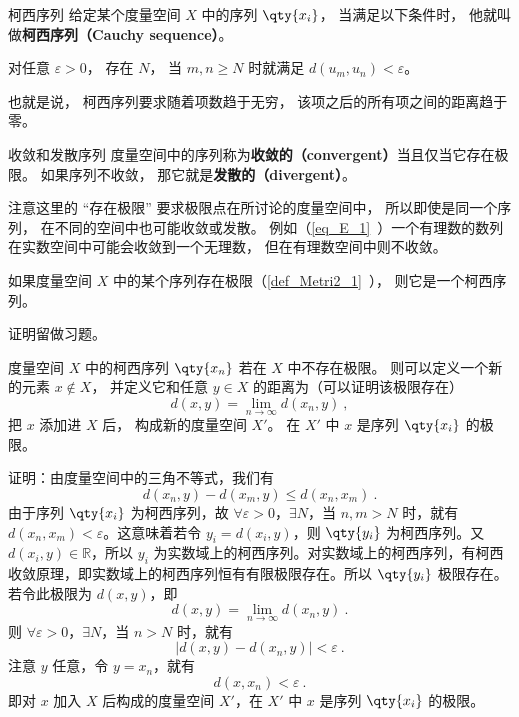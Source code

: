 

\begin{definition}{柯西序列}
给定某个度量空间 $X$ 中的序列 $\qty{x_i}$， 当满足以下条件时， 他就叫做\textbf{柯西序列（Cauchy sequence）}。

对任意 $\varepsilon > 0$， 存在 $N$， 当 $m, n \geqslant N$ 时就满足 $d(u_m, u_n) < \varepsilon$。
\end{definition}
也就是说， 柯西序列要求随着项数趋于无穷， 该项之后的所有项之间的距离趋于零。

\begin{definition}{收敛和发散序列}\label{def_cauchy_1}
度量空间中的序列称为\textbf{收敛的（convergent）}当且仅当它存在极限。 如果序列不收敛， 那它就是\textbf{发散的（divergent）}。
\end{definition}
注意这里的 “存在极限” 要求极限点在所讨论的度量空间中， 所以即使是同一个序列， 在不同的空间中也可能收敛或发散。 例如（\autoref{eq_E_1}~）一个有理数的数列在实数空间中可能会收敛到一个无理数， 但在有理数空间中则不收敛。

\begin{theorem}{}
如果度量空间 $X$ 中的某个序列存在极限（\autoref{def_Metri2_1}~）， 则它是一个柯西序列。
\end{theorem}
证明留做习题。

\begin{theorem}{}\label{the_cauchy_1}
度量空间 $X$ 中的柯西序列 $\qty{x_n}$ 若在 $X$ 中不存在极限。 则可以定义一个新的元素 $x \notin X$， 并定义它和任意 $y\in X$ 的距离为（可以证明该极限存在）
\begin{equation}
d(x, y) = \lim_{n\to\infty} d(x_n, y)~,
\end{equation}
把 $x$ 添加进 $X$ 后， 构成新的度量空间 $X'$。 在 $X'$ 中 $x$ 是序列 $\qty{x_i}$ 的极限。
\end{theorem}
证明：由度量空间中的三角不等式，我们有
\begin{equation}
d(x_n,y)-d(x_m,y)\leq d(x_n,x_m)~.
\end{equation}
由于序列 $\qty{x_i}$ 为柯西序列，故 $\forall\varepsilon>0$，$\exists N$，当 $n,m>N$ 时，就有 $d(x_n,x_m)<\varepsilon$。这意味着若令 $y_i=d(x_i,y)$，则 $\qty{y_i}$ 为柯西序列。又 $d(x_i,y)\in \mathbb R$，所以 ${y_i}$ 为实数域上的柯西序列。对实数域上的柯西序列，有柯西收敛原理，即实数域上的柯西序列恒有有限极限存在。所以 $\qty{y_i}$ 极限存在。若令此极限为 $d(x,y)$，即
\begin{equation}
d(x, y) = \lim_{n\to\infty} d(x_n, y)~.
\end{equation}
则 $\forall\varepsilon>0$，$\exists N$，当 $n>N$ 时，就有 
\begin{equation}
|d(x,y)-d(x_n,y)|<\varepsilon~.
\end{equation}
注意 $y$ 任意，令 $y=x_n$，就有
\begin{equation}
d(x,x_n)<\varepsilon~.
\end{equation}
即对 $x$ 加入 $X$ 后构成的度量空间 $X'$，在 $X'$ 中 $x$ 是序列 $\qty{x_i}$ 的极限。

